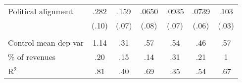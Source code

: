 {{\begin{tabular}{lcccccc}
Political alignment 
        &        .282\sym{***}&        .159\sym{**} &       .0650         &       .0935         &       .0739         &        .103\sym{***}\\
        &       (.10)         &       (.07)         &       (.08)         &       (.07)         &       (.06)         &       (.03)         \\
\\
Control mean dep var 	
		 &        1.14         &         .31         &         .57         &         .54         &         .46         &         .57         \\

\% of revenues    	
		 &         .20         &         .15         &         .14         &         .31         &         .21         &           1         \\
R$^2$          		
		 &         .81         &         .40         &         .69         &         .35         &         .54         &         .67         \\

\bottomrule							




\end{tabular}
}
}

